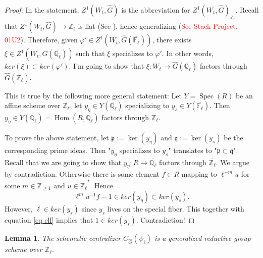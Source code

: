 \documentclass{article}
\newcommand{\red}[1]{\textcolor{red}{#1}}
\newtheorem{lemma}{Lemma}
\newcommand{\Hom}{\operatorname{Hom}}
\newcommand{\Spec}{\operatorname{Spec}}
\begin{document}
\begin{proof}
	In the statement, $Z^1(W_t, \hat{G})$ is the abbreviation for $Z^1(W_t, \hat{G})_{\overline{\mathbb{Z}_{\ell}}}$. Recall that $Z^1(W_t, \hat{G}) \to \overline{\mathbb{Z}_{\ell}}$ is flat (See \cite[Proposition 3.3]{dat2022ihes}), hence generalizing (\red{See Stack Project, 01U2}). Therefore, given $\varphi' \in Z^1(W_t, \hat{G}(\overline{\mathbb{F}_{\ell}}))$, there exists $\xi \in Z^1(W_t, \hat{G}(\overline{\mathbb{Q}_{\ell}}))$ such that $\xi$ specializes to $\varphi'$. In other words, $ker(\xi) \subset ker(\varphi')$. I'm going to show that $\xi: W_t \to \hat{G}(\overline{\mathbb{Q}_{\ell}})$ factors through  $\hat{G}(\overline{\mathbb{Z}_{\ell}})$.
	
	This is true by the following more general statement: Let $Y=\Spec(R)$ be an affine scheme over $\overline{\mathbb{Z}_{\ell}}$, let $y_{\eta} \in Y(\overline{\mathbb{Q}_{\ell}})$ specializing to $y_s \in Y(\overline{\mathbb{F}_{\ell}})$.  Then $y_{\eta} \in Y(\overline{\mathbb{Q}_{\ell}})=\Hom(R, \overline{\mathbb{Q}_{\ell}})$ factors through $\overline{\mathbb{Z}_{\ell}}$.
	
    To prove the above statement, let $\mathfrak{p}:=\ker(y_\eta)$ and $\mathfrak{q}:=\ker(y_s)$ be the corresponding prime ideas. Then "$y_{\eta}$ specializes to $y_s$" translates to "$\mathfrak{p} \subset \mathfrak{q}$". Recall that we are going to show that $y_{\eta}: R \to \overline{\mathbb{Q}_{\ell}}$ factors through $\overline{\mathbb{Z}_{\ell}}$. We argue by contradiction. Otherwise there is some element $f \in R$ mapping to $\ell^{-m}u$ for some $m \in \mathbb{Z}_{\geq 1}$ and $u \in \overline{\mathbb{Z}_{\ell}}^*$. Hence 
    \begin{equation}\label{eq ell}
    	\ell^mu^{-1}f-1 \in ker(y_{\eta}) \subset ker(y_s).
    \end{equation}
    However, $\ell \in ker(y_s)$ since $y_s$ lives on the special fiber. This together with equation \ref{eq ell} implies that $1 \in ker(y_s)$. Contradiction!
\end{proof}

\begin{lemma}\label{Lem gen red}
	The schematic centralizer $C_{\hat{G}}(\psi_{\ell})$ is a generalized reductive group scheme over $\overline{\mathbb{Z}_{\ell}}$.
\end{lemma}
\end{document}
